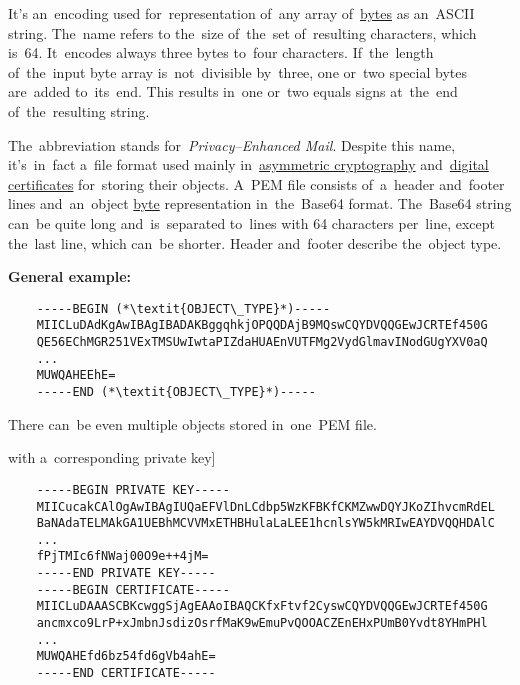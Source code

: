 \label{multitasking}

\label{concurrency}

\label{loosetightcoupling}

\label{base64}
It's an~encoding used for~representation of~any array of~\hyperref[bitsandbytes]{bytes} as an~ASCII string.
The~name refers to the~size of~the~set of~resulting characters, which is~64.
It~encodes always three bytes to~four characters.
If~the~length of~the~input byte array is~not~divisible by~three, one or~two special bytes are~added to~its~end.
This results in~one or~two equals signs at~the~end of~the~resulting string.

\label{pem}
The~abbreviation stands for~\textit{Privacy--Enhanced Mail}.
Despite this name, it's~in~fact a~file format used mainly in~\hyperref[asymmetriccryptography]{asymmetric cryptography} and~\hyperref[certificate]{digital certificates} for~storing their objects.
A~PEM file consists of~a~header and~footer lines and~an~object \hyperref[bitsandbytes]{byte} representation in~the~Base64 format.
The~Base64 string can~be quite long and~is~separated to~lines with 64 characters per~line, except the~last line, which can~be shorter.
Header and~footer describe the~object type.
\newline

\noindent \textbf{General example:}
\begin{lstlisting}
    -----BEGIN (*\textit{OBJECT\_TYPE}*)-----
    MIICLuDAdKgAwIBAgIBADAKBggqhkjOPQQDAjB9MQswCQYDVQQGEwJCRTEf450G
    QE56EChMGR251VExTMSUwIwtaPIZdaHUAEnVUTFMg2VydGlmavINodGUgYXV0aQ
    ...
    MUWQAHEEhE=
    -----END (*\textit{OBJECT\_TYPE}*)-----
\end{lstlisting}
\newline

\noindent There can~be even multiple objects stored in~one~PEM file.

\example[\hyperref[certificate]{certificate} with a~corresponding private key]
\begin{lstlisting}
    -----BEGIN PRIVATE KEY-----
    MIICucakCAlOgAwIBAgIUQaEFVlDnLCdbp5WzKFBKfCKMZwwDQYJKoZIhvcmRdEL
    BaNAdaTELMAkGA1UEBhMCVVMxETHBHulaLaLEE1hcnlsYW5kMRIwEAYDVQQHDAlC
    ...
    fPjTMIc6fNWaj00O9e++4jM=
    -----END PRIVATE KEY-----
    -----BEGIN CERTIFICATE-----
    MIICLuDAAASCBKcwggSjAgEAAoIBAQCKfxFtvf2CyswCQYDVQQGEwJCRTEf450G
    ancmxco9LrP+xJmbnJsdizOsrfMaK9wEmuPvQOOACZEnEHxPUmB0Yvdt8YHmPHl
    ...
    MUWQAHEfd6bz54fd6gVb4ahE=
    -----END CERTIFICATE-----
\end{lstlisting}

